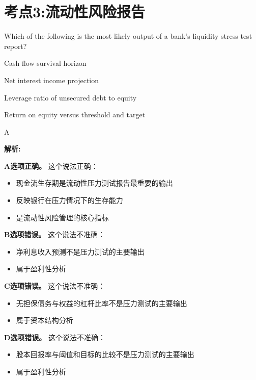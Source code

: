 \documentclass{article}
\newcounter{question} %
\newenvironment{explanation}
{\textbf{解析:}\par}
{\par}
\begin{document}
\newpage


\section{考点3:流动性风险报告}
\setcounter{question}{0}
\begin{question}
    Which of the following is the most likely output of a bank's liquidity stress test report?
\end{question}

\begin{choices}
    \item Cash flow survival horizon
    \item Net interest income projection
    \item Leverage ratio of unsecured debt to equity
    \item Return on equity versus threshold and target
\end{choices}

\begin{correctanswer}
    A
\end{correctanswer}

\begin{explanation}
    \textbf{A选项正确。}
    这个说法正确：
    \begin{itemize}
        \item 现金流生存期是流动性压力测试报告最重要的输出
        \item 反映银行在压力情况下的生存能力
        \item 是流动性风险管理的核心指标
    \end{itemize}

    \textbf{B选项错误。}
    这个说法不准确：
    \begin{itemize}
        \item 净利息收入预测不是压力测试的主要输出
        \item 属于盈利性分析
    \end{itemize}

    \textbf{C选项错误。}
    这个说法不准确：
    \begin{itemize}
        \item 无担保债务与权益的杠杆比率不是压力测试的主要输出
        \item 属于资本结构分析
    \end{itemize}

    \textbf{D选项错误。}
    这个说法不准确：
    \begin{itemize}
        \item 股本回报率与阈值和目标的比较不是压力测试的主要输出
        \item 属于盈利性分析
    \end{itemize}
\end{explanation}
\end{document}
